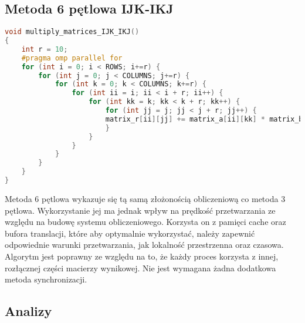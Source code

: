 \documentclass{scrartcl}
\begin{document}
\subsection{Metoda 6 pętlowa IJK-IKJ}
\begin{lstlisting}[language=C++, caption={Metoda sześciopętlowa}]
void multiply_matrices_IJK_IKJ()
{
	int r = 10;
	#pragma omp parallel for
	for (int i = 0; i < ROWS; i+=r) {
		for (int j = 0; j < COLUMNS; j+=r) {
			for (int k = 0; k < COLUMNS; k+=r) {
				for (int ii = i; ii < i + r; ii++) {
					for (int kk = k; kk < k + r; kk++) {
						for (int jj = j; jj < j + r; jj++) {
						matrix_r[ii][jj] += matrix_a[ii][kk] * matrix_b[kk][jj];
						}
					}
				}
			}
		}
	}
}
\end{lstlisting}
Metoda 6 pętlowa wykazuje się tą samą złożonością obliczeniową co metoda 3 pętlowa. Wykorzystanie jej ma jednak wpływ na prędkość przetwarzania ze względu na budowę systemu obliczeniowego. Korzysta on z pamięci cache oraz bufora translacji, które aby optymalnie wykorzystać, należy zapewnić odpowiednie warunki przetwarzania, jak lokalność przestrzenna oraz czasowa. Algorytm jest poprawny ze względu na to, że każdy proces korzysta z innej, rozłącznej części macierzy wynikowej. Nie jest wymagana żadna dodatkowa metoda synchronizacji.
\subsection{Analizy}
\section{}
\end{document}
